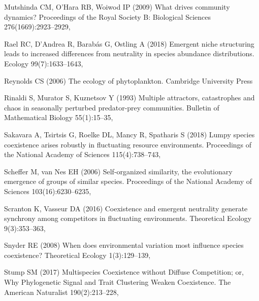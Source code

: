 \documentclass[smallcondensed,referee]{svjour3}       %
\begin{document}
\begin{thebibliography}{56}
Mutshinda CM, O'Hara RB, Woiwod IP (2009) What drives community dynamics?
  Proceedings of the Royal Society B: Biological Sciences 276(1669):2923--2929,

Rael RC, D'Andrea R, Barab{\'a}s G, Ostling A (2018) Emergent niche structuring
  leads to increased differences from neutrality in species abundance
  distributions. Ecology 99(7):1633--1643, 

Reynolds CS (2006) The ecology of phytoplankton. Cambridge University Press

Rinaldi S, Murator S, Kuznetsov Y (1993) Multiple attractors, catastrophes and
  chaos in seasonally perturbed predator-prey communities. Bulletin of
  Mathematical Biology 55(1):15--35, 

Sakavara A, Tsirtsis G, Roelke DL, Mancy R, Spatharis S (2018) Lumpy species
  coexistence arises robustly in fluctuating resource environments. Proceedings
  of the National Academy of Sciences 115(4):738--743,

Scheffer M, van Nes EH (2006) Self-organized similarity, the evolutionary
  emergence of groups of similar species. Proceedings of the National Academy
  of Sciences 103(16):6230--6235, 

Scranton K, Vasseur DA (2016) Coexistence and emergent neutrality generate
  synchrony among competitors in fluctuating environments. Theoretical Ecology
  9(3):353--363, 

Snyder RE (2008) When does environmental variation most influence species
  coexistence? Theoretical Ecology 1(3):129--139,

Stump SM (2017) Multispecies {Coexistence} without {Diffuse} {Competition}; or,
  {Why} {Phylogenetic} {Signal} and {Trait} {Clustering} {Weaken}
  {Coexistence}. The American Naturalist 190(2):213--228, 


\end{thebibliography}
\end{document}
